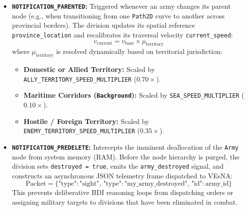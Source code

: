 \begin{itemize}
    \item \textbf{\texttt{NOTIFICATION\_PARENTED}:} Triggered whenever an army changes its parent node (e.g., when transitioning from one \texttt{Path2D} curve to another across provincial borders). The division updates its spatial reference \texttt{province\_location} and recalibrates its traversal velocity \texttt{current\_speed}:
    \begin{equation}
        v_{\text{current}} = v_{\text{base}} \times \mu_{\text{territory}}
    \end{equation}
    where $\mu_{\text{territory}}$ is resolved dynamically based on territorial jurisdiction:
    \begin{itemize}
        \item \textbf{Domestic or Allied Territory:} Scaled by \texttt{ALLY\_TERRITORY\_SPEED\_MULTIPLIER} ($0.70\times$).
        \item \textbf{Maritime Corridors (\texttt{Background}):} Scaled by \texttt{SEA\_SPEED\_MULTIPLIER} ($0.10\times$).
        \item \textbf{Hostile / Foreign Territory:} Scaled by \texttt{ENEMY\_TERRITORY\_SPEED\_MULTIPLIER} ($0.35\times$).
    \end{itemize}
    \item \textbf{\texttt{NOTIFICATION\_PREDELETE}:} Intercepts the imminent deallocation of the \texttt{Army} node from system memory (RAM). Before the node hierarchy is purged, the division sets \texttt{destroyed = true}, emits the \texttt{army\_destroyed} signal, and constructs an asynchronous JSON telemetry frame dispatched to VEsNA:
    \begin{equation}
        \text{Packet} = \big\{ \text{"type"}: \text{"sight"}, \, \text{"type"}: \text{"my\_army\_destroyed"}, \, \text{"id"}: \text{army\_id} \big\}
    \end{equation}
    This prevents deliberative BDI reasoning loops from dispatching orders or assigning military targets to divisions that have been eliminated in combat.
\end{itemize}

